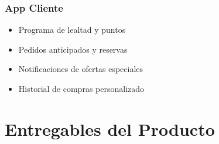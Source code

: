 \documentclass[12pt,letterpaper]{article}
\begin{document}
\subsubsection{App Cliente}
\begin{itemize}
    \item Programa de lealtad y puntos
    \item Pedidos anticipados y reservas
    \item Notificaciones de ofertas especiales
    \item Historial de compras personalizado
\end{itemize}

\section{Entregables del Producto}
\end{document}
